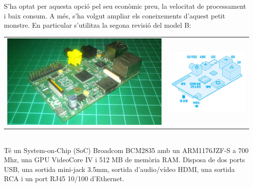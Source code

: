 \documentclass[twoside]{article}
\begin{document}
S'ha optat per aquesta opció pel seu econòmic preu, la velocitat de processament i baix consum. A més, s'ha volgut ampliar els coneixements d'aquest petit monstre. En particular s'utilitza la segona revisió del model B:
 
\begin{tabular}{cc}
\hspace{1cm}\includegraphics[scale=0.06]{images/RPi.jpg} & \hspace{0.5cm} \includegraphics[scale=0.3]{images/RPi2.jpg}
\end{tabular} \\

Té un System-on-Chip (SoC) Broadcom BCM2835 amb un ARM1176JZF-S a 700 Mhz, una GPU VideoCore IV i 512 MB de memòria RAM. Disposa de dos ports USB, una sortida mini-jack 3.5mm, sortida d'audio/vídeo HDMI, una sortida RCA i un port RJ45 10/100 d'Ethernet. 
\end{document}
